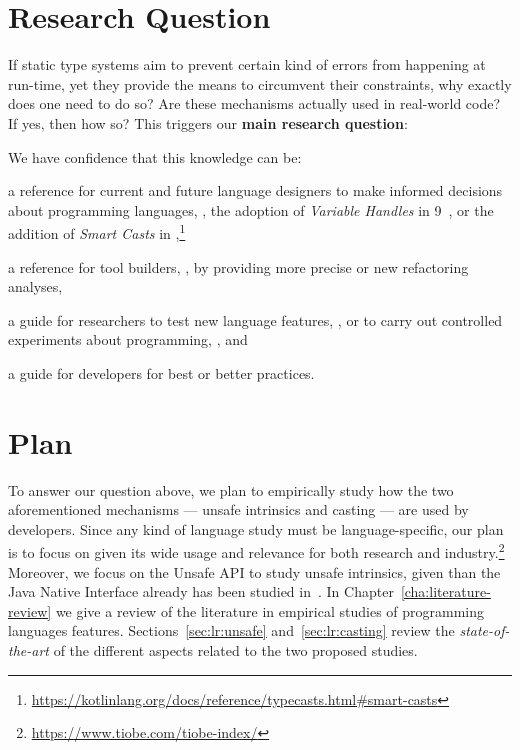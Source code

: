 \section{Research Question}

If static type systems aim to prevent certain kind of errors from happening at run-time,
yet they provide the means to circumvent their constraints,
why exactly does one need to do so?
Are these mechanisms actually used in real-world code?
If yes, then how so?
This triggers our \textbf{main research question}:


We have confidence that this knowledge can be:
\begin{inparaenum}[a)]
\item a reference for current and future language designers
to make informed decisions about programming languages,
\eg{}, the adoption of \emph{Variable Handles} in \java{} 9~\citep{jep193},
or the addition of \emph{Smart Casts} in ,\footnote{\url{https://kotlinlang.org/docs/reference/typecasts.html\#smart-casts}}
\item a reference for tool builders, \eg{}, by providing more precise or new refactoring analyses,
\item a guide for researchers to test new language features, \eg{}, \cite{wintherGuardedTypePromotion2011} or to carry out controlled experiments about programming, \eg{}, \cite{stuchlikStaticVsDynamic2011} and
\item a guide for developers for best or better practices.
\end{inparaenum}

\section{Plan}

To answer our question above,
we plan to empirically study how the two aforementioned mechanisms
--- unsafe intrinsics and casting ---
are used by developers.
Since any kind of language study must be language-specific,
our plan is to focus on \java{} given its wide usage and relevance for both
research and industry.\footnote{\url{https://www.tiobe.com/tiobe-index/}}
Moreover, we focus on the \java{} Unsafe API to study unsafe intrinsics,
given than the Java Native Interface already has been studied in~\cite{tanSafeJavaNative2006,tanEmpiricalSecurityStudy2008,kondohFindingBugsJava2008,sunNativeGuardProtectingAndroid2014,liFindingBugsExceptional2009}.
In Chapter~\ref{cha:literature-review} we give a review of the literature in empirical studies of programming languages features.
Sections~\ref{sec:lr:unsafe} and~\ref{sec:lr:casting} review the \emph{state-of-the-art} of the different aspects related to the two proposed studies.

